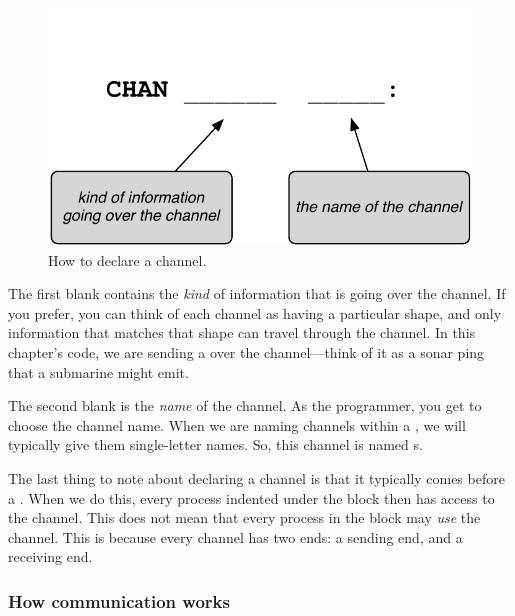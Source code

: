 \begin{figure}[h]
  \begin{center}
    \includegraphics[width=0.6\linewidth]{images/pattern-channel-decl}
    \caption{How to declare a channel.}
    \label{diagram:pattern-channel-decl}
  \end{center}
\end{figure}

The first blank contains the {\em kind} of information that is going over the channel. If you prefer, you can think of each channel as having a particular shape, and only information that matches that shape can travel through the channel. In this chapter's code, we are sending a \SIGNAL over the channel---think of it as a sonar ping that a submarine might emit.

The second blank is the {\em name} of the channel. As the programmer, you get to choose the channel name. When we are naming channels within a \PROC, we will typically give them single-letter names. So, this channel is named {\code s}. 

The last thing to note about declaring a channel is that it typically comes before a \PAR. When we do this, every process indented under the \PARallel block then has access to the channel. This does not mean that every process in the block may {\em use} the channel. This is because every channel has two ends: a sending end, and a receiving end.

\subsubsection{How communication works}


